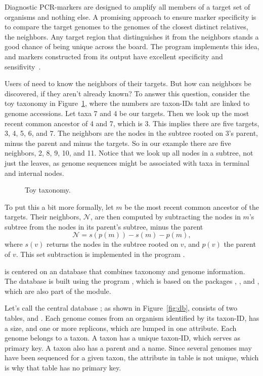 Diagnostic PCR-markers are designed to amplify all members of a target
set of organisms and nothing else. A promising approach to ensure
marker specificity is to compare the target genomes to the genomes of
the closest distinct relatives, the neighbors. Any target region that
distinguishes it from the neighbors stands a good chance of being
unique across the board. The program  implements this idea,
and markers constructed from its output have excellent specificity and
sensifivity~\cite{hau21:fur}.

Users of  need to know the neighbors of their targets. But how
can neighbors be discovered, if they aren't already known? To answer
this question, consider the toy taxonomy in Figure~\ref{fig:tax},
where the numbers are taxon-IDs taht are linked to genome
accessions. Let taxa 7 and 4 be our targets. Then we look up the most
recent common ancestor of 4 and 7, which is 3. This implies there are
five targets, 3, 4, 5, 6, and 7. The neighbors are the nodes in the
subtree rooted on 3's parent, minus the parent and minus the
targets. So in our example there are five neighbors, 2, 8, 9, 10, and
11. Notice that we look up all nodes in a subtree, not just the
leaves, as genome sequences might be associated with taxa in terminal
and internal nodes.

\begin{figure}
\begin{center}

\end{center}
\caption{Toy taxonomy.}\label{fig:tax}
\end{figure}

To put this a bit more formally, let $m$ be the most recent common
ancestor of the targets. Their neighbors, $\mathcal{N}$, are then
computed by subtracting the nodes in $m$'s subtree from the nodes in
its parent's subtree, minus the parent
\begin{equation}\label{eq:nei}
\mathcal{N} = s(p(m)) - s(m) - p(m),
\end{equation}
where $s(v)$ returns the nodes in the subtree rooted on $v$, and
$p(v)$ the parent of $v$. This set subtraction is implemented in the
program .

 is centered on an 
database that combines taxonomy and genome information. The database
is built using the program , which is based on the
packages , , and , which are also part of the
 module.

Let's call the central database ; as shown in
Figure~\ref{fig:db},  consists of two
tables,  and . Each genome comes from an organism
identified by its taxon-ID, has a size, and one or more replicons,
which are lumped in one attribute. Each genome belongs to a taxon. A
taxon has a unique taxon-ID, which serves as primary key. A taxon also
has a parent and a name. Since several genomes may have been sequenced for a
given taxon, the attribute  in
table  is not unique, which is why that table has no
primary key.

